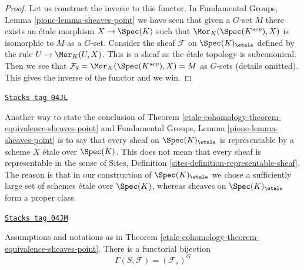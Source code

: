 \begin{proof}
Let us construct the inverse to this functor. In
Fundamental Groups, Lemma \ref{pione-lemma-sheaves-point}
we have seen that given a $G$-set $M$ there exists an \'etale morphism
$X \to \Spec(K)$
such that $\Mor_K(\Spec(K^{sep}), X)$ is
isomorphic to $M$ as a $G$-set. Consider the sheaf
$\mathcal{F}$ on $\Spec(K)_\etale$ defined by
the rule $U \mapsto \Mor_K(U, X)$. This is a sheaf as the \'etale
topology is subcanonical. Then we see that
$\mathcal{F}_{\overline{s}} = \Mor_K(\Spec(K^{sep}), X) = M$
as $G$-sets (details omitted). This gives the inverse of the functor and
we win.
\end{proof}

\begin{remark}
\label{etale-cohomology-remark-every-sheaf-representable}
\href{https://stacks.math.columbia.edu/tag/04JL}{\texttt{Stacks tag 04JL}}

Another way to state the conclusion of
Theorem \ref{etale-cohomology-theorem-equivalence-sheaves-point} and
Fundamental Groups, Lemma \ref{pione-lemma-sheaves-point}
is to say that every sheaf on $\Spec(K)_\etale$ is representable
by a scheme $X$ \'etale over $\Spec(K)$.
This does not mean that every sheaf is representable in the sense of
Sites, Definition \ref{sites-definition-representable-sheaf}.
The reason is that in our construction of $\Spec(K)_\etale$
we chose a sufficiently large set of schemes \'etale over $\Spec(K)$,
whereas sheaves on $\Spec(K)_\etale$ form a proper class.
\end{remark}

\begin{lemma}
\label{etale-cohomology-lemma-global-sections-point}
\href{https://stacks.math.columbia.edu/tag/04JM}{\texttt{Stacks tag 04JM}}

Assumptions and notations as in
Theorem \ref{etale-cohomology-theorem-equivalence-sheaves-point}.
There is a functorial bijection
$$
\Gamma(S, \mathcal{F}) = (\mathcal{F}_{\overline{s}})^G
$$
\end{lemma}

